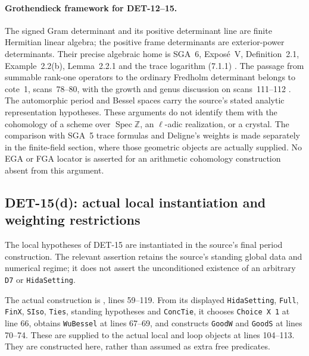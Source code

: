 \documentclass[11pt,a4paper]{article}
\newcommand{\Spec}{\operatorname{Spec}}
\newcommand{\Z}{\mathbb Z}
\newcommand{\fid}[1]{\textsf{#1}}
\begin{document}
\paragraph{Grothendieck framework for \fid{DET-12--15}.}
The signed Gram determinant and its positive determinant line are
finite Hermitian linear algebra; the positive frame determinants
are exterior-power determinants. Their precise algebraic home is
SGA~6, Expos\'e~V, Definition~2.1, Example~2.2(b), Lemma~2.2.1
and the trace logarithm (7.1.1) \cite{sga6}.
The passage from summable rank-one operators to the ordinary
Fredholm determinant belongs to cote~1, scans~78--80, with the
growth and genus discussion on scans~111--112 \cite{archive}.
The automorphic period and Bessel spaces carry the source's stated
analytic representation hypotheses. These arguments do not
identify them with the cohomology of a scheme over $\Spec\Z$,
an $\ell$-adic realization, or a crystal. The comparison with
SGA~5 trace formulas and Deligne's weights is made separately in
the finite-field section, where those geometric objects are
actually supplied. No EGA or FGA locator is asserted for an
arithmetic cohomology construction absent from this argument.

\subsection{DET-15(d): actual local instantiation and weighting restrictions}

The local hypotheses of \fid{DET-15} are instantiated in the source's
final period construction.  The relevant assertion retains the source's
standing global data and numerical regime; it does not assert the
unconditioned existence of an arbitrary \texttt{D7} or
\texttt{HidaSetting}.

The actual construction is
,
lines 59--119.  From its displayed \texttt{HidaSetting}, \texttt{Full},
\texttt{FinX}, \texttt{SIso}, \texttt{Ties}, standing hypotheses and
\texttt{ConcTie}, it chooses \texttt{Choice X 1} at line 66, obtains
\texttt{WuBessel} at lines 67--69, and constructs
\texttt{GoodW} and \texttt{GoodS} at lines 70--74.  These are supplied
to the actual local and loop objects at lines 104--113.
They are constructed here, rather than assumed as extra free predicates.
\end{document}
